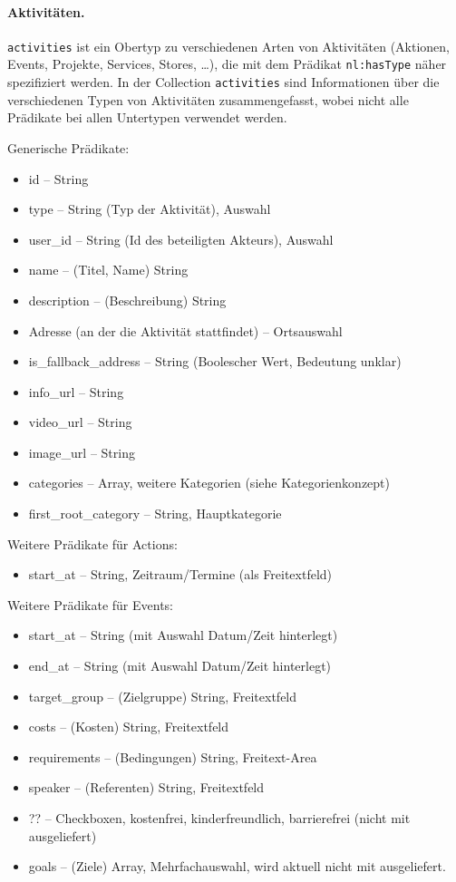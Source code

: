 \documentclass[a4paper,11pt]{article}
\begin{document}
\paragraph{Aktivitäten.}
\texttt{activities} ist ein Obertyp zu verschiedenen Arten von Aktivitäten
(Aktionen, Events, Projekte, Services, Stores, \ldots), die mit dem Prädikat
\texttt{nl:hasType} näher spezifiziert werden.  In der Collection
\texttt{activities} sind Informationen über die verschiedenen Typen von
Aktivitäten zusammengefasst, wobei nicht alle Prädikate bei allen Untertypen
verwendet werden. 

Generische Prädikate:
\begin{itemize}\itemsep0pt
  \item id -- String
  \item type -- String (Typ der Aktivität), Auswahl
  \item user\_id -- String (Id des beteiligten Akteurs), Auswahl
  \item name -- (Titel, Name) String
  \item description -- (Beschreibung) String
  \item Adresse (an der die Aktivität stattfindet) -- Ortsauswahl
  \item is\_fallback\_address -- String (Boolescher Wert, Bedeutung unklar)
  \item info\_url -- String
  \item video\_url -- String
  \item image\_url -- String
  \item categories -- Array, weitere Kategorien (siehe Kategorienkonzept)
  \item first\_root\_category -- String, Hauptkategorie
\end{itemize}

Weitere Prädikate für Actions:
\begin{itemize}\itemsep0pt
  \item start\_at -- String, Zeitraum/Termine (als Freitextfeld)
\end{itemize}

Weitere Prädikate für Events:
\begin{itemize}\itemsep0pt
  \item start\_at -- String (mit Auswahl Datum/Zeit hinterlegt)
  \item end\_at -- String (mit Auswahl Datum/Zeit hinterlegt)
  \item target\_group -- (Zielgruppe) String, Freitextfeld
  \item costs -- (Kosten) String, Freitextfeld
  \item requirements -- (Bedingungen) String, Freitext-Area
  \item speaker -- (Referenten) String, Freitextfeld
  \item ?? -- Checkboxen, kostenfrei, kinderfreundlich, barrierefrei (nicht
    mit ausgeliefert) 
  \item goals -- (Ziele) Array, Mehrfachauswahl, wird aktuell nicht mit
    ausgeliefert.
\end{itemize}
\end{document}
